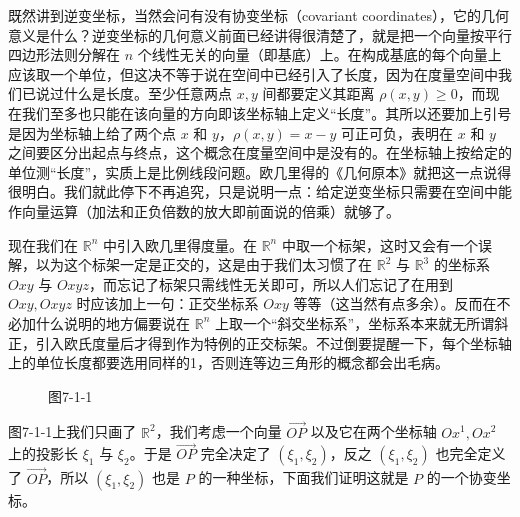 既然讲到逆变坐标，当然会问有没有协变坐标（covariant coordinates），它的几何意义是什么？逆变坐标的几何意义前面已经讲得很清楚了，就是把一个向量按平行四边形法则分解在 $n$ 个线性无关的向量（即基底）上。在构成基底的每个向量上应该取一个单位，但这决不等于说在空间中已经引入了长度，因为在度量空间中我们已说过什么是长度。至少任意两点 $x,y$ 间都要定义其距离 $\rho(x,y)\ge0$，而现在我们至多也只能在该向量的方向即该坐标轴上定义“长度”。其所以还要加上引号是因为坐标轴上给了两个点 $x$ 和 $y$，$\rho(x,y)=x-y$ 可正可负，表明在 $x$ 和 $y$ 之间要区分出起点与终点，这个概念在度量空间中是没有的。在坐标轴上按给定的单位测“长度”，实质上是比例线段问题。欧几里得的《几何原本》就把这一点说得很明白。我们就此停下不再追究，只是说明一点：给定逆变坐标只需要在空间中能作向量运算（加法和正负倍数的放大即前面说的倍乘）就够了。

现在我们在 $\mathbb R^n$ 中引入欧几里得度量。在 $\mathbb R^n$ 中取一个标架，这时又会有一个误解，以为这个标架一定是正交的，这是由于我们太习惯了在 $\mathbb R^2$ 与 $\mathbb R^3$ 的坐标系 $Oxy$ 与 $Oxyz$，而忘记了标架只需线性无关即可，所以人们忘记了在用到 $Oxy,Oxyz$ 时应该加上一句：正交坐标系 $Oxy$ 等等（这当然有点多余）。反而在不必加什么说明的地方偏要说在 $\mathbb R^n$ 上取一个“斜交坐标系”，坐标系本来就无所谓斜正，引入欧氏度量后才得到作为特例的正交标架。不过倒要提醒一下，每个坐标轴上的单位长度都要选用同样的1，否则连等边三角形的概念都会出毛病。

\begin{figure}[htbp]
\centering
{}
\caption*{图7-1-1}
\end{figure}

图7-1-1上我们只画了 $\mathbb R^2$，我们考虑一个向量 $\overrightarrow{OP}$ 以及它在两个坐标轴 $Ox^1,Ox^2$ 上的投影长 $\xi_1$ 与 $\xi_2$。于是 $\overrightarrow{OP}$ 完全决定了 $(\xi_1,\xi_2)$，反之 $(\xi_1,\xi_2)$ 也完全定义了 $\overrightarrow{OP}$，所以 $(\xi_1,\xi_2)$ 也是 $P$ 的一种坐标，下面我们证明这就是 $P$ 的一个协变坐标。

